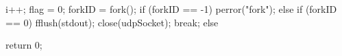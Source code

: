 \begin{DoxyCode}
{{                i++;
                flag = 0;
                forkID = fork();
                if (forkID == -1){
                        perror("fork"); }
                else if (forkID == 0) {
                        fflush(stdout);
                        close(udpSocket);
                        break;
                } else {
                
                }
        

        }
        return 0;


}
\end{DoxyCode}
